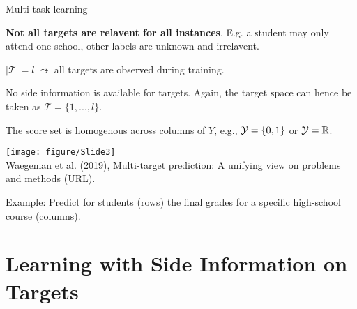 \documentclass[11pt,compress,t,notes=noshow, xcolor=table]{beamer}
\newcommand{\Tspace}{\mathcal{T}}
\begin{document}
\begin{frame}{Multi-task learning}

		\begin{itemize}\small
			
			\begin{minipage}{0.45\textwidth}  

                \item \textbf{Not all targets are relavent for all instances}. E.g. a student may only attend one school, other labels are unknown and irrelavent.
                \vspace{10pt}
                
                \item $|\Tspace|= l$ $\leadsto$ all targets are observed during training.
                \vspace{10pt}

			    \item No side information is available for targets. Again, the target space can hence be taken as $\Tspace = \{1,...,l\}$. 
                \vspace{10pt}
       
				\item The score set is homogenous across columns of $Y$, e.g., $\mathcal{Y} = \{0,1\}$ or $\mathcal{Y} = \mathbb{R}$.
                \vspace{10pt}

			\end{minipage}
            \hfill
			\begin{minipage}{0.45\textwidth}    
				\begin{center} 	
					\texttt{[image: figure/Slide3]} \tiny
					\\ Waegeman et al. (2019), Multi-target prediction:
					A unifying view on problems and methods (\href{https://arxiv.org/pdf/1809.02352.pdf}{\underline{URL}}).	
				\end{center}
			\end{minipage}
		\end{itemize}
    \vspace{10pt}
	Example: Predict for students (rows) the final grades for a specific high-school course (columns).


\end{frame}


\section{Learning with Side Information on Targets}
\end{document}
